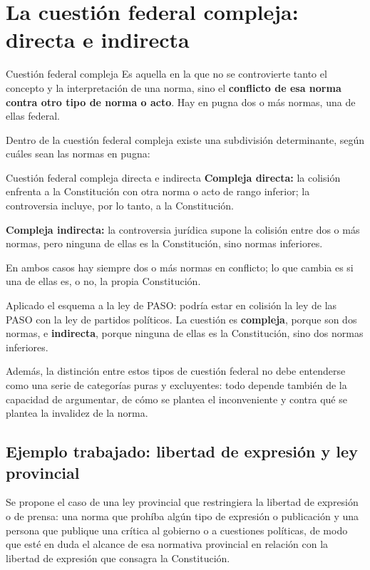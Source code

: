 \documentclass[12pt,oneside]{book}
\begin{document}
\section{La cuestión federal compleja: directa e indirecta}
\label{sec:compleja}

\begin{definition}{Cuestión federal compleja}
Es aquella en la que no se controvierte tanto el concepto y la interpretación de una norma, sino el \textbf{conflicto de esa norma contra otro tipo de norma o acto}. Hay en pugna dos o más normas, una de ellas federal.
\end{definition}

Dentro de la cuestión federal compleja existe una subdivisión determinante, según cuáles sean las normas en pugna:

\begin{definition}{Cuestión federal compleja directa e indirecta}
\textbf{Compleja directa:} la colisión enfrenta a la Constitución con otra norma o acto de rango inferior; la controversia incluye, por lo tanto, a la Constitución.

\textbf{Compleja indirecta:} la controversia jurídica supone la colisión entre dos o más normas, pero ninguna de ellas es la Constitución, sino normas inferiores.

En ambos casos hay siempre dos o más normas en conflicto; lo que cambia es si una de ellas es, o no, la propia Constitución.
\end{definition}

Aplicado el esquema a la ley de PASO: podría estar en colisión la ley de las PASO con la ley de partidos políticos. La cuestión es \textbf{compleja}, porque son dos normas, e \textbf{indirecta}, porque ninguna de ellas es la Constitución, sino dos normas inferiores.

Además, la distinción entre estos tipos de cuestión federal no debe entenderse como una serie de categorías puras y excluyentes: todo depende también de la capacidad de argumentar, de cómo se plantea el inconveniente y contra qué se plantea la invalidez de la norma.

\subsection{Ejemplo trabajado: libertad de expresión y ley provincial}

Se propone el caso de una ley provincial que restringiera la libertad de expresión o de prensa: una norma que prohíba algún tipo de expresión o publicación y una persona que publique una crítica al gobierno o a cuestiones políticas, de modo que esté en duda el alcance de esa normativa provincial en relación con la libertad de expresión que consagra la Constitución.
\end{document}
